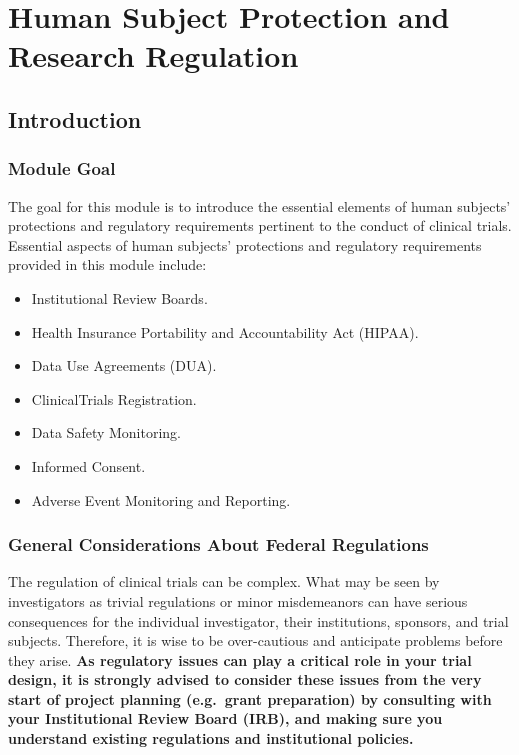 \documentclass[]{book}
\providecommand{\tightlist}{%
  \setlength{\itemsep}{0pt}\setlength{\parskip}{0pt}}
\theoremstyle{definition}
\theoremstyle{definition}
\theoremstyle{definition}
\theoremstyle{remark}
\begin{document}
\chapter{Human Subject Protection and Research
Regulation}\label{human-subject-protection-and-research-regulation}

\section{Introduction}\label{introduction-2}

\subsection{Module Goal}\label{module-goal}

The goal for this module is to introduce the essential elements of human
subjects' protections and regulatory requirements pertinent to the
conduct of clinical trials. Essential aspects of human subjects'
protections and regulatory requirements provided in this module include:

\begin{itemize}
\tightlist
\item
  Institutional Review Boards.
\item
  Health Insurance Portability and Accountability Act (HIPAA).
\item
  Data Use Agreements (DUA).
\item
  ClinicalTrials Registration.
\item
  Data Safety Monitoring.
\item
  Informed Consent.
\item
  Adverse Event Monitoring and Reporting.
\end{itemize}

\subsection{General Considerations About Federal
Regulations}\label{general-considerations-about-federal-regulations}

The regulation of clinical trials can be complex. What may be seen by
investigators as trivial regulations or minor misdemeanors can have
serious consequences for the individual investigator, their
institutions, sponsors, and trial subjects. Therefore, it is wise to be
over-cautious and anticipate problems before they arise. \textbf{As
regulatory issues can play a critical role in your trial design, it is
strongly advised to consider these issues from the very start of project
planning (e.g.~grant preparation) by consulting with your Institutional
Review Board (IRB), and making sure you understand existing regulations
and institutional policies.}
\end{document}
